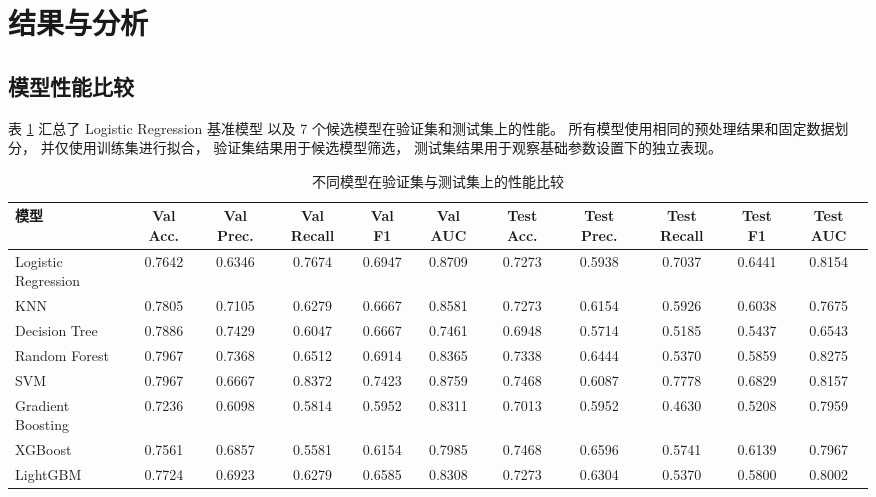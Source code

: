 \section{结果与分析}

\subsection{模型性能比较}

表 \ref{tab:model_comparison} 汇总了 Logistic Regression 基准模型
以及 7 个候选模型在验证集和测试集上的性能。
所有模型使用相同的预处理结果和固定数据划分，
并仅使用训练集进行拟合，
验证集结果用于候选模型筛选，
测试集结果用于观察基础参数设置下的独立表现。

\begin{table}[!t]
  \caption{不同模型在验证集与测试集上的性能比较}
  \label{tab:model_comparison}
  \centering
  \scriptsize
  \setlength{\tabcolsep}{2pt}
  \begin{tabular*}{\textwidth}{@{\extracolsep{\fill}}lcccccccccc@{}}
    \toprule
    模型
    & Val Acc. & Val Prec. & Val Recall & Val F1 & Val AUC
    & Test Acc. & Test Prec. & Test Recall & Test F1 & Test AUC \\
    \midrule
    Logistic Regression
    & 0.7642 & 0.6346 & 0.7674 & 0.6947 & 0.8709
    & 0.7273 & 0.5938 & 0.7037 & 0.6441 & 0.8154 \\
    KNN
    & 0.7805 & 0.7105 & 0.6279 & 0.6667 & 0.8581
    & 0.7273 & 0.6154 & 0.5926 & 0.6038 & 0.7675 \\
    Decision Tree
    & 0.7886 & 0.7429 & 0.6047 & 0.6667 & 0.7461
    & 0.6948 & 0.5714 & 0.5185 & 0.5437 & 0.6543 \\
    Random Forest
    & 0.7967 & 0.7368 & 0.6512 & 0.6914 & 0.8365
    & 0.7338 & 0.6444 & 0.5370 & 0.5859 & 0.8275 \\
    SVM
    & 0.7967 & 0.6667 & 0.8372 & 0.7423 & 0.8759
    & 0.7468 & 0.6087 & 0.7778 & 0.6829 & 0.8157 \\
    Gradient Boosting
    & 0.7236 & 0.6098 & 0.5814 & 0.5952 & 0.8311
    & 0.7013 & 0.5952 & 0.4630 & 0.5208 & 0.7959 \\
    XGBoost
    & 0.7561 & 0.6857 & 0.5581 & 0.6154 & 0.7985
    & 0.7468 & 0.6596 & 0.5741 & 0.6139 & 0.7967 \\
    LightGBM
    & 0.7724 & 0.6923 & 0.6279 & 0.6585 & 0.8308
    & 0.7273 & 0.6304 & 0.5370 & 0.5800 & 0.8002 \\
    \bottomrule
  \end{tabular*}
\end{table}

